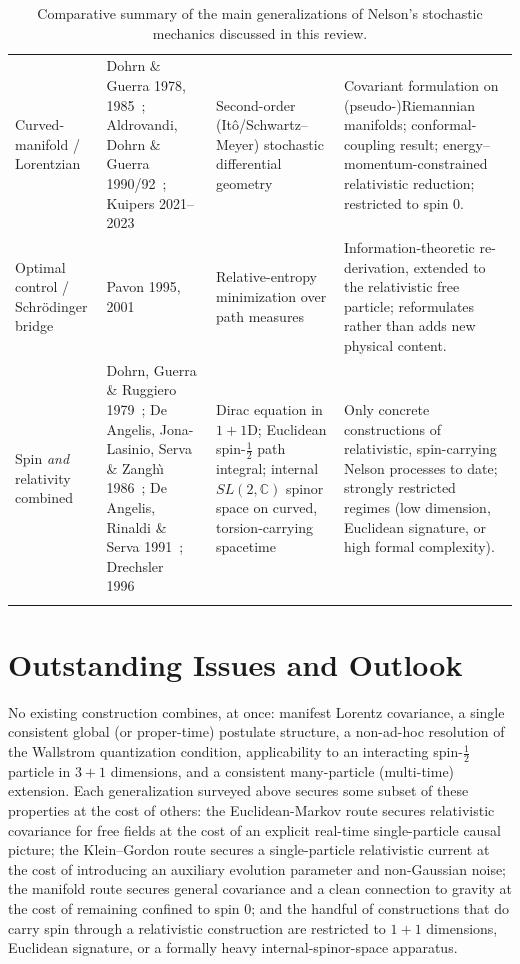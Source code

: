 \documentclass[11pt]{article}
\begin{document}
\begin{longtable}{@{}p{2.6cm}p{3.3cm}p{4.0cm}p{4.7cm}@{}}
Curved-manifold / Lorentzian &
Dohrn \& Guerra 1978, 1985~\cite{dohrnguerra78,dohrnguerra85}; Aldrovandi, Dohrn \& Guerra 1990/92~\cite{aldrovandi90,aldrovandi92}; Kuipers 2021--2023~\cite{kuipers2021a,kuipers2021b,kuipers2023} &
Second-order (It\^o/Schwartz--Meyer) stochastic differential geometry &
Covariant formulation on (pseudo-)Riemannian manifolds; conformal-coupling result; energy--momentum-constrained relativistic reduction; restricted to spin 0. \\[4pt]
Optimal control / Schr\"odinger bridge &
Pavon 1995, 2001~\cite{pavon95,pavon2001} &
Relative-entropy minimization over path measures &
Information-theoretic re-derivation, extended to the relativistic free particle; reformulates rather than adds new physical content. \\[4pt]
Spin \emph{and} relativity combined &
Dohrn, Guerra \& Ruggiero 1979~\cite{dohrnguerraruggiero79}; De Angelis, Jona-Lasinio, Serva \& Zangh\`{\i} 1986~\cite{deangelisjls86}; De Angelis, Rinaldi \& Serva 1991~\cite{deangelisrinaldiserva91}; Drechsler 1996~\cite{drechsler96} &
Dirac equation in $1{+}1$D; Euclidean spin-$\tfrac12$ path integral; internal $SL(2,\mathbb C)$ spinor space on curved, torsion-carrying spacetime &
Only concrete constructions of relativistic, spin-carrying Nelson processes to date; strongly restricted regimes (low dimension, Euclidean signature, or high formal complexity). \\
\bottomrule
\caption{Comparative summary of the main generalizations of Nelson's stochastic mechanics discussed in this review.}
\label{tab:summary}
\end{longtable}
\endgroup

\section{Outstanding Issues and Outlook}\label{sec:outlook}

No existing construction combines, at once: manifest Lorentz covariance, a
single consistent global (or proper-time) postulate structure, a non-ad-hoc
resolution of the Wallstrom quantization condition, applicability to an
interacting spin-$\tfrac12$ particle in $3{+}1$ dimensions, and a consistent
many-particle (multi-time) extension. Each generalization surveyed above
secures some subset of these properties at the cost of others: the
Euclidean-Markov route secures relativistic covariance for free fields at the
cost of an explicit real-time single-particle causal picture; the Klein--Gordon
route secures a single-particle relativistic current at the cost of introducing
an auxiliary evolution parameter and non-Gaussian noise; the manifold route
secures general covariance and a clean connection to gravity at the cost of
remaining confined to spin 0; and the handful of constructions that do carry
spin through a relativistic construction are restricted to $1{+}1$ dimensions,
Euclidean signature, or a formally heavy internal-spinor-space apparatus.
\end{document}
